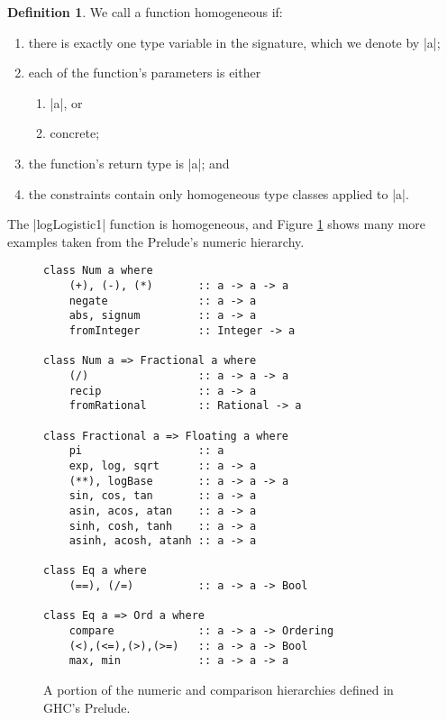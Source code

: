 \documentclass[preprint]{sigplanconf}
\theoremstyle{definition}
\newtheorem{defn}{Definition}
\begin{document}
\begin{defn}
We call a function homogeneous if:
\begin{enumerate}
\item
there is exactly one type variable in the signature, which we denote by |a|;
\item
each of the function's parameters is either
\begin{enumerate}
\item
|a|, or
\item
concrete;
\end{enumerate}
\item
the function's return type is |a|; and
\item
the constraints contain only homogeneous type classes applied to |a|.
\end{enumerate}
The |logLogistic1| function is homogeneous,
and Figure \ref{code:ghc} shows many more examples taken from the Prelude's numeric hierarchy.
\end{defn}



\begin{figure}
\begin{lstlisting}
class Num a where
    (+), (-), (*)       :: a -> a -> a
    negate              :: a -> a
    abs, signum         :: a -> a
    fromInteger         :: Integer -> a

class Num a => Fractional a where
    (/)                 :: a -> a -> a
    recip               :: a -> a
    fromRational        :: Rational -> a

class Fractional a => Floating a where
    pi                  :: a
    exp, log, sqrt      :: a -> a
    (**), logBase       :: a -> a -> a
    sin, cos, tan       :: a -> a
    asin, acos, atan    :: a -> a
    sinh, cosh, tanh    :: a -> a
    asinh, acosh, atanh :: a -> a

class Eq a where
    (==), (/=)          :: a -> a -> Bool

class Eq a => Ord a where
    compare             :: a -> a -> Ordering
    (<),(<=),(>),(>=)   :: a -> a -> Bool
    max, min            :: a -> a -> a
\end{lstlisting}
\caption{
    A portion of the numeric and comparison hierarchies defined in GHC's Prelude.
}
\label{code:ghc}
\end{figure}
\end{document}
